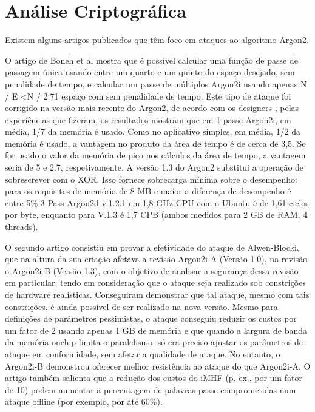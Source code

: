 \documentclass[conference]{IEEEtran}
\begin{document}
\section{Análise Criptográfica}

Existem alguns artigos publicados que têm foco em ataques ao algoritmo Argon2. 

O artigo de Boneh et al \cite{boneh2016balloon} mostra que é possível calcular uma função de passe 
de passagem única usando entre um quarto e um quinto do espaço desejado, sem penalidade 
de tempo, e calcular um passe de múltiplos Argon2i usando apenas N / E <N / 2.71 espaço 
com sem penalidade de tempo. Este tipo de ataque foi corrigido na versão mais recente do 
Argon2, de acordo com os designers \cite{argon2spec}, pelas experiências que fizeram, 
os resultados mostram que em 1-passe Argon2i, em média, 1/7 da memória é usado. 
Como no aplicativo simples, em média, 1/2 da memória é usado, a vantagem no produto da 
área de tempo é de cerca de 3,5. Se for usado o valor da memória de pico nos cálculos 
da área de tempo, a vantagem seria de 5 e 2.7, respetivamente. A versão 1.3 do Argon2 
substitui a operação de sobrescrever com o XOR. Isso fornece sobrecarga mínima sobre o 
desempenho: para os requisitos de memória de 8 MB e maior a diferença de desempenho é 
entre 5\% 3-Pass Argon2d v.1.2.1 em 1,8 GHz CPU com o Ubuntu é de 1,61 ciclos por byte, 
enquanto para V.1.3 é 1,7 CPB (ambos medidos para 2 GB de RAM, 4 threads). 

O segundo artigo \cite{alwen2017towards} consistiu em provar a efetividade do ataque de Alwen-Blocki, 
que na altura da sua criação afetava a revisão Argon2i-A (Versão 1.0), na revisão 
o Argon2i-B (Versão 1.3), com o objetivo de analisar a segurança dessa revisão em particular, 
tendo em consideração que o ataque seja realizado sob constrições de hardware realísticas. 
Conseguiram demonstrar que tal ataque, mesmo com tais constrições, é ainda possível de ser 
realizado na nova versão. Mesmo para definições de parâmetros pessimistas, o ataque 
conseguiu reduzir os custos por um fator de 2 usando apenas 1 GB de memória e que 
quando a largura de banda da memória onchip limita o paralelismo, só era preciso ajustar 
os parâmetros de ataque em conformidade, sem afetar a qualidade de ataque. No entanto, 
o Argon2i-B demonstrou oferecer melhor resistência ao ataque do que Argon2i-A. 
O artigo também salienta que a redução dos custos do iMHF (p. ex., por um fator de 10) podem 
aumentar a percentagem de palavras-passe comprometidas num ataque offline (por exemplo, por 
até 60\%). 
\end{document}
